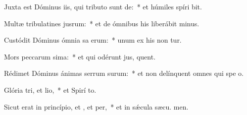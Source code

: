 \item Juxta est Dóminus iis, qui tributo sunt de:~* et húmiles spíri bit.
\item Multæ tribulatines jusrum:~* et de ómnibus his liberábit  minus.
\item Custódit Dóminus ómnia sa erum:~* unum ex his non tur.
\item Mors peccarum sima:~* et qui odérunt jus, quent.
\item Rédimet Dóminus ánimas serrum surum:~* et non delínquent omnes qui spe  o.
\item Glória tri, et lio,~* et Spirí to.
\item Sicut erat in princípio, et , et per,~* et in sǽcula sæcu. men.
